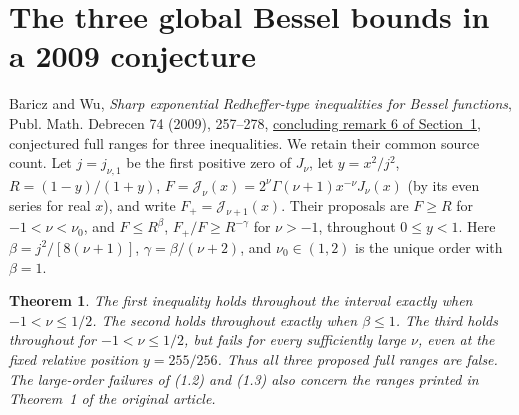\documentclass[11pt,a4paper]{article}
\newtheorem{theorem}{Theorem}[section]
\numberwithin{equation}{section}
\begin{document}
\section{The three global Bessel bounds in a 2009 conjecture}
\label{sec:red}
Baricz and Wu, \emph{Sharp exponential Redheffer-type inequalities for
Bessel functions}, Publ. Math. Debrecen 74 (2009), 257--278,
\href{https://doi.org/10.5486/PMD.2009.4291}{concluding remark 6 of
Section~1}, conjectured full ranges for three inequalities. We retain
their common source count. Let $j=j_{\nu,1}$ be the first positive
zero of $J_\nu$, let $y=x^2/j^2$, $R=(1-y)/(1+y)$,
$F=\mathcal J_\nu(x)=2^\nu\Gamma(\nu+1)x^{-\nu}J_\nu(x)$ (by its
even series for real $x$), and write $F_+=\mathcal J_{\nu+1}(x)$.
Their proposals are $F\ge R$ for $-1<\nu<\nu_0$, and $F\le R^\beta$,
$F_+/F\ge R^{-\gamma}$ for $\nu>-1$, throughout $0\le y<1$.
Here $\beta=j^2/[8(\nu+1)]$, $\gamma=\beta/(\nu+2)$, and
$\nu_0\in(1,2)$ is the unique order with $\beta=1$.
\begin{theorem}\label{th:red}
The first inequality holds throughout the interval exactly when
$-1<\nu\le1/2$. The second holds throughout exactly when $\beta\le1$.
The third holds throughout for $-1<\nu\le1/2$, but fails for every
sufficiently large $\nu$, even at the fixed relative position
$y=255/256$. Thus all three proposed full ranges are false. The
large-order failures of (1.2) and (1.3) also concern the ranges
printed in Theorem~1 of the original article.
\end{theorem}
\end{document}
